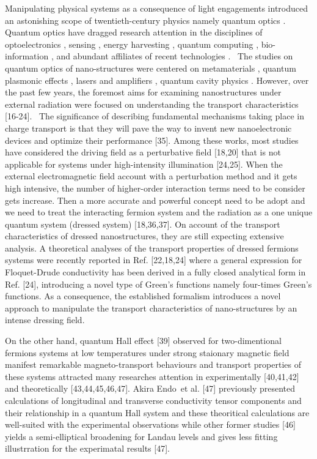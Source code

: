 Manipulating physical systems as a consequence of light engagements introduced an astonishing scope of twentieth-century physics namely quantum optics \cite{grynberg10}.
Quantum optics have dragged research attention in the disciplines of optoelectronics \cite{liu16,wijesekara20,tao21}, sensing \cite{rodrigo2015,pirandola18,hapuarachchi2018}, energy harvesting \cite{yuan16,sun18},
quantum computing \cite{huh15,slussarenko19,andersen21}, bio-information \cite{marais18,bian20}, and abundant affiliates of recent technologies \cite{rivera20}. 
The studies on quantum optics of nano-structures were centered on metamaterials \cite{shalaev07,si14}, quantum plasmonic effects \cite{hapuarachchi19,perera20}, lasers and amplifiers \cite{zhang05,chow13}, quantum cavity physics \cite{tsang10,devi20}. However, over the past few years, the foremost aims for examining nanostructures under external radiation were focused on understanding the transport characteristics [16-24]. 
The significance of describing fundamental mechanisms taking place in charge transport is that they will pave the way to invent new nanoelectronic devices and optimize their performance [35].
Among these works, most studies have considered the driving field as a perturbative field [18,20] that is not applicable for systems under high-intensity illumination [24,25]. When the external electromagnetic field account with a perturbation method and it gets high intensive, the number of higher-order interaction terms need to be consider gets increase. Then a more accurate and powerful concept need to be adopt and we need to treat the interacting fermion system and the radiation as a one unique quantum system (dressed system) [18,36,37]. On account of the transport characteristics of dressed nanostructures, they are still expecting extensive analysis.
A theoretical analyses of the transport properties of dressed fermions systems were recently reported in Ref. [22,18,24] where a general expression for Floquet-Drude conductivity has been derived in a fully closed analytical form in Ref. [24], introducing a novel type of Green’s functions namely four-times Green’s functions. As a consequence, the established formalism introduces a novel approach to manipulate the transport characteristics of nano-structures by an intense dressing field.

On the other hand, quantum Hall effect [39] observed for two-dimentional fermions systems at low temperatures under strong staionary magnetic field manifest remarkable magneto-transport behaviours and transport properties of these systems attracted many researches attention in experimentally [40,41,42] and theoretically [43,44,45,46,47]. Akira Endo et al. [47] previously presented calculations of longitudinal and transverse conductivity tensor components and their relationship in a quantum Hall system and these theoritical calculations are well-suited with the experimental observations while other former studies [46] yields a semi-elliptical broadening for Landau levels and gives less fitting illustrration for the experimatal results [47].

